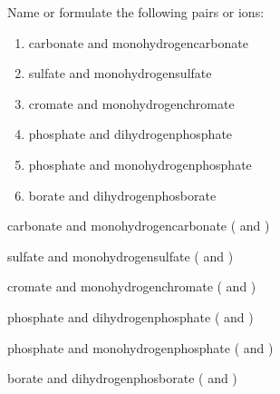 \documentclass[main.tex]{subfiles}
\begin{document}
\begin{multicols*}{2}
\begin{question}[ID=\the\value{numA}]
Name or formulate the following pairs or ions:
   \begin{multicols}{2}\noindent
  \begin{enumerate} [topsep=0pt, partopsep=0pt, label=(\alph*), leftmargin=.5cm]
\item carbonate and monohydrogencarbonate %
 \item sulfate and monohydrogensulfate %
 \item cromate and monohydrogenchromate %
 \item phosphate and dihydrogenphosphate %
 \item phosphate and monohydrogenphosphate %
 \item borate and dihydrogenphosborate %
\end{enumerate}  \end{multicols} 
\end{question}
\begin{solution}
\begin{inparaenum}[(a)]
 \item carbonate and monohydrogencarbonate  ( and )
 \item sulfate and monohydrogensulfate  ( and )
 \item cromate and monohydrogenchromate  ( and )
 \item phosphate and dihydrogenphosphate  ( and )
 \item phosphate and monohydrogenphosphate  ( and )
 \item borate and dihydrogenphosborate  ( and )
\end{inparaenum}\hspace{0.1cm}\end{solution}




\end{multicols*}
\end{document}
